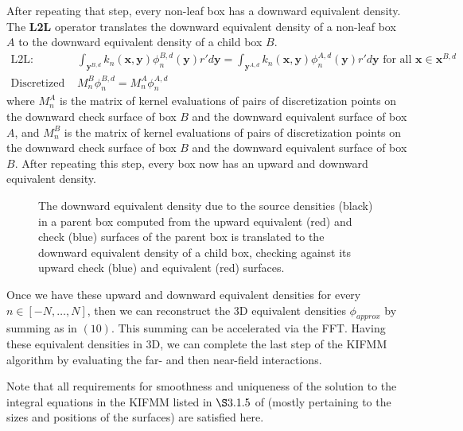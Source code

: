 \documentclass[11pt, oneside]{article}   	%
\begin{document}
After repeating that step, every non-leaf box has a downward equivalent density. The \textbf{L2L} operator translates the downward equivalent density of a non-leaf box $A$ to the downward equivalent density of a child box $B$.
\begin{align}
\mbox{L2L: }&\int_{\mathbf{y}^{B,d}}{k_n(\mathbf{x},\mathbf{y})}\phi^{B,d}_n{(\mathbf{y})}r'd\mathbf{y}=\int_{\mathbf{y}^{A,d}}{k_n(\mathbf{x},\mathbf{y})}\phi^{A,d}_n{(\mathbf{y})}r'd\mathbf{y}\mbox{ for all }\mathbf{x}\in\mathbf{x}^{B,d}\\
\mbox{Discretized L2L: }&M_n^B\phi^{B,d}_n=M_n^A\phi^{A,d}_n
\end{align}
where $M_n^A$ is the matrix of kernel evaluations of pairs of discretization points on the downward check surface of box $B$ and the downward equivalent surface of box $A$, and $M_n^B$ is the matrix of kernel evaluations of pairs of discretization points on the downward check surface of box $B$ and the downward equivalent surface of box $B$. After repeating this step, every box now has an upward and downward equivalent density.

\begin{figure}[!ht]
\begin{center}
\end{center}
\caption{The downward equivalent density due to the source densities (black) in a parent box computed from the upward equivalent (red) and check (blue) surfaces of the parent box is translated to the downward equivalent density of a child box, checking against its upward check (blue) and equivalent (red) surfaces.}
\end{figure}

Once we have these upward and downward equivalent densities for every $n\in[-N,\dots,N]$, then we can reconstruct the 3D equivalent densities $\phi_{approx}$ by summing as in $(10)$. This summing can be accelerated via the FFT. Having these equivalent densities in 3D, we can complete the last step of the KIFMM algorithm by evaluating the far- and then near-field interactions.

Note that all requirements for smoothness and uniqueness of the solution to the integral equations in the KIFMM listed in $\S3.1.5$ of \cite{YBZ} (mostly pertaining to the sizes and positions of the surfaces) are satisfied here.
\end{document}
